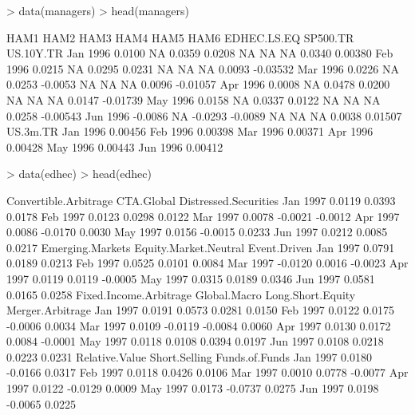 \documentclass[12pt,letterpaper,english]{article}
\begin{document}
\begin{Schunk}
\begin{Sinput}
> data(managers)
> head(managers)
\end{Sinput}
\begin{Soutput}
            HAM1 HAM2    HAM3    HAM4 HAM5 HAM6 EDHEC.LS.EQ SP500.TR US.10Y.TR
Jan 1996  0.0100   NA  0.0359  0.0208   NA   NA          NA   0.0340   0.00380
Feb 1996  0.0215   NA  0.0295  0.0231   NA   NA          NA   0.0093  -0.03532
Mar 1996  0.0226   NA  0.0253 -0.0053   NA   NA          NA   0.0096  -0.01057
Apr 1996  0.0008   NA  0.0478  0.0200   NA   NA          NA   0.0147  -0.01739
May 1996  0.0158   NA  0.0337  0.0122   NA   NA          NA   0.0258  -0.00543
Jun 1996 -0.0086   NA -0.0293 -0.0089   NA   NA          NA   0.0038   0.01507
         US.3m.TR
Jan 1996  0.00456
Feb 1996  0.00398
Mar 1996  0.00371
Apr 1996  0.00428
May 1996  0.00443
Jun 1996  0.00412
\end{Soutput}
\begin{Sinput}
> data(edhec)
> head(edhec)
\end{Sinput}
\begin{Soutput}
         Convertible.Arbitrage CTA.Global Distressed.Securities
Jan 1997                0.0119     0.0393                0.0178
Feb 1997                0.0123     0.0298                0.0122
Mar 1997                0.0078    -0.0021               -0.0012
Apr 1997                0.0086    -0.0170                0.0030
May 1997                0.0156    -0.0015                0.0233
Jun 1997                0.0212     0.0085                0.0217
         Emerging.Markets Equity.Market.Neutral Event.Driven
Jan 1997           0.0791                0.0189       0.0213
Feb 1997           0.0525                0.0101       0.0084
Mar 1997          -0.0120                0.0016      -0.0023
Apr 1997           0.0119                0.0119      -0.0005
May 1997           0.0315                0.0189       0.0346
Jun 1997           0.0581                0.0165       0.0258
         Fixed.Income.Arbitrage Global.Macro Long.Short.Equity Merger.Arbitrage
Jan 1997                 0.0191       0.0573            0.0281           0.0150
Feb 1997                 0.0122       0.0175           -0.0006           0.0034
Mar 1997                 0.0109      -0.0119           -0.0084           0.0060
Apr 1997                 0.0130       0.0172            0.0084          -0.0001
May 1997                 0.0118       0.0108            0.0394           0.0197
Jun 1997                 0.0108       0.0218            0.0223           0.0231
         Relative.Value Short.Selling Funds.of.Funds
Jan 1997         0.0180       -0.0166         0.0317
Feb 1997         0.0118        0.0426         0.0106
Mar 1997         0.0010        0.0778        -0.0077
Apr 1997         0.0122       -0.0129         0.0009
May 1997         0.0173       -0.0737         0.0275
Jun 1997         0.0198       -0.0065         0.0225
\end{Soutput}
\end{Schunk}
\end{document}
